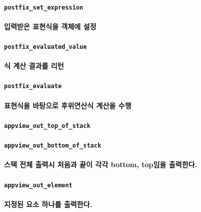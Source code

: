 \documentclass[UTF8]{report}
\begin{document}
            \paragraph{\texttt{postfix\_set\_expression}}
            \paragraph{%
                \normalfont 입력받은 표현식을 객체에 설정
            }

            \paragraph{\texttt{postfix\_evaluated\_value}}
            \paragraph{%
                \normalfont 식 계산 결과를 리턴
            }

            \paragraph{\texttt{postfix\_evaluate}}
            \paragraph{%
                \normalfont 표현식을 바탕으로 후위연산식 계산을 수행
            }

            \paragraph{\texttt{appview\_out\_top\_of\_stack}}
            \paragraph{\texttt{appview\_out\_bottom\_of\_stack}}
            \paragraph{%
                \normalfont 스택 전체 출력시 처음과 끝이 각각 bottom, top임을 출력한다.
            }

            \paragraph{\texttt{appview\_out\_element}}
            \paragraph{%
                \normalfont 지정된 요소 하나를 출력한다.
            }
            
\end{document}
